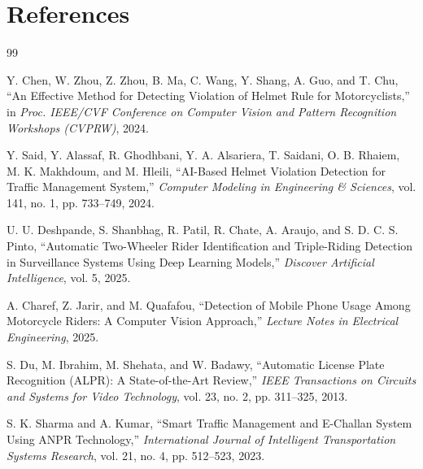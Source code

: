 \documentclass[12pt,a4paper]{article}
\begin{document}
\newpage
\section*{References}
\begin{thebibliography}{99}

Y. Chen, W. Zhou, Z. Zhou, B. Ma, C. Wang, Y. Shang, A. Guo, and T. Chu, ``An Effective Method for Detecting Violation of Helmet Rule for Motorcyclists,'' in \textit{Proc. IEEE/CVF Conference on Computer Vision and Pattern Recognition Workshops (CVPRW)}, 2024.

Y. Said, Y. Alassaf, R. Ghodhbani, Y. A. Alsariera, T. Saidani, O. B. Rhaiem, M. K. Makhdoum, and M. Hleili, ``AI-Based Helmet Violation Detection for Traffic Management System,'' \textit{Computer Modeling in Engineering \& Sciences}, vol. 141, no. 1, pp. 733--749, 2024.

U. U. Deshpande, S. Shanbhag, R. Patil, R. Chate, A. Araujo, and S. D. C. S. Pinto, ``Automatic Two-Wheeler Rider Identification and Triple-Riding Detection in Surveillance Systems Using Deep Learning Models,'' \textit{Discover Artificial Intelligence}, vol. 5, 2025.

A. Charef, Z. Jarir, and M. Quafafou, ``Detection of Mobile Phone Usage Among Motorcycle Riders: A Computer Vision Approach,'' \textit{Lecture Notes in Electrical Engineering}, 2025.

S. Du, M. Ibrahim, M. Shehata, and W. Badawy, ``Automatic License Plate Recognition (ALPR): A State-of-the-Art Review,'' \textit{IEEE Transactions on Circuits and Systems for Video Technology}, vol. 23, no. 2, pp. 311--325, 2013.

S. K. Sharma and A. Kumar, ``Smart Traffic Management and E-Challan System Using ANPR Technology,'' \textit{International Journal of Intelligent Transportation Systems Research}, vol. 21, no. 4, pp. 512--523, 2023.

\end{thebibliography}
\end{document}
